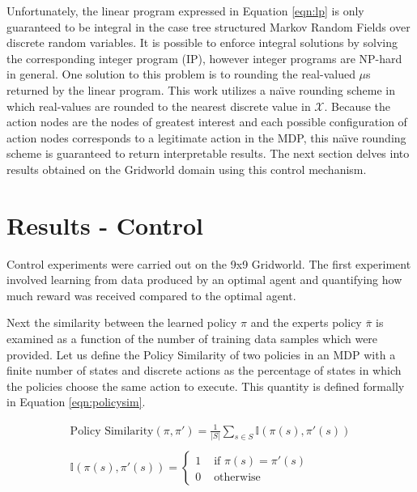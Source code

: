 \documentclass{article} %
\begin{document}
Unfortunately, the linear program expressed in Equation \ref{eqn:lp} is only guaranteed to be integral in the case tree structured Markov Random Fields over discrete random variables. It is possible to enforce integral solutions by solving the corresponding integer program (IP), however integer programs are NP-hard in general. One solution to this problem is to rounding the real-valued $\mu$s returned by the linear program. This work utilizes a na\"{\i}ve rounding scheme in which real-values are rounded to the nearest discrete value in $\mathcal{X}$. Because the action nodes are the nodes of greatest interest and each possible configuration of action nodes corresponds to a legitimate action in the MDP, this na\"{\i}ve rounding scheme is guaranteed to return interpretable results. The next section delves into results obtained on the Gridworld domain using this control mechanism.

\section{Results - Control}
Control experiments were carried out on the 9x9 Gridworld. The first experiment involved learning from data produced by an optimal agent and quantifying how much reward was received compared to the optimal agent.

Next the similarity between the learned policy $\pi$ and the experts policy $\bar{\pi}$ is examined as a function of the number of training data samples which were provided. Let us define the Policy Similarity of two policies in an MDP with a finite number of states and discrete actions as the percentage of states in which the policies choose the same action to execute. This quantity is defined formally in Equation \ref{eqn:policysim}.

\begin{equation}
\begin{array}{l}
\textrm{Policy Similarity}(\pi,\pi') = \frac{1}{|S|}\sum_{s \in S} \mathbb{I}(\pi(s),\pi'(s)) \\
\\
\mathbb{I}(\pi(s),\pi'(s)) = \left\{ \begin{array}{rl}
 1 &\mbox{ if $\pi(s) = \pi'(s)$} \\
 0 &\mbox{ otherwise}
\end{array} \right. \\
\end{array}
\label{eqn:policysim}
\end{equation}
\end{document}
